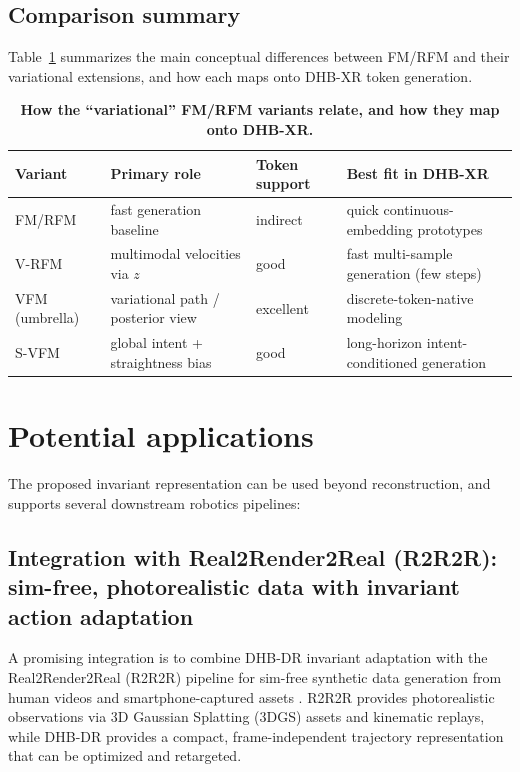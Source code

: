 \documentclass[11pt]{article}
\begin{document}
\subsection{Comparison summary}
Table~\ref{tab:vfm_variants} summarizes the main conceptual differences between FM/RFM and their variational extensions, and how each maps onto DHB-XR token generation.
\begin{table}[H]
  \centering
  \small
  \begin{tabularx}{\linewidth}{@{}lXXX@{}}
    \toprule
    \textbf{Variant} & \textbf{Primary role} & \textbf{Token support} & \textbf{Best fit in DHB-XR} \\
    \midrule
    FM/RFM & fast generation baseline & indirect & quick continuous-embedding prototypes \\
    V-RFM & multimodal velocities via $z$ & good & fast multi-sample generation (few steps) \\
    VFM (umbrella) & variational path / posterior view & excellent & discrete-token-native modeling \\
    S-VFM & global intent + straightness bias & good & long-horizon intent-conditioned generation \\
    \bottomrule
  \end{tabularx}
  \caption{\textbf{How the ``variational'' FM/RFM variants relate, and how they map onto DHB-XR.}}
  \label{tab:vfm_variants}
\end{table}

\section{Potential applications}
The proposed invariant representation can be used beyond reconstruction, and supports several downstream robotics pipelines:

\subsection{Integration with Real2Render2Real (R2R2R): sim-free, photorealistic data with invariant action adaptation}
A promising integration is to combine DHB-DR invariant adaptation with the Real2Render2Real (R2R2R) pipeline for sim-free synthetic data generation from human videos and smartphone-captured assets \cite{yu2025r2r2r}. R2R2R provides photorealistic observations via 3D Gaussian Splatting (3DGS) assets \cite{kerbl2023gaussiansplatting} and kinematic replays, while DHB-DR provides a compact, frame-independent trajectory representation that can be optimized and retargeted.
\end{document}
